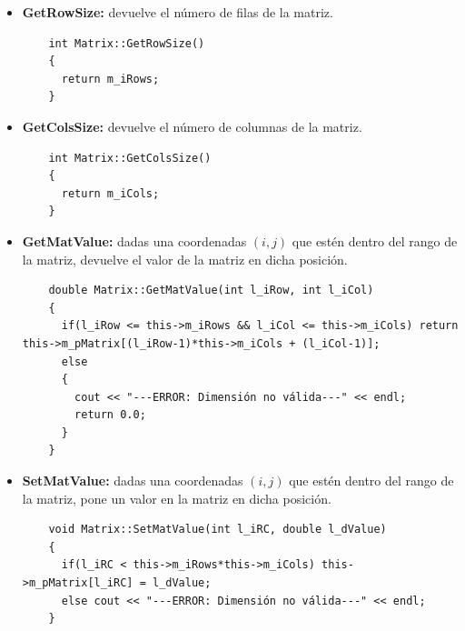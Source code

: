 \begin{itemize}
    \begin{verbatim}
    void Matrix::operator~(void)
    {
      int j =0;
      for(int i = 0; i <this->m_iRows*this->m_iCols; i++)
      {
        cout << m_pMatrix [i] << "\t";
        j++;
        if(j == this->m_iCols)
        {
          cout << endl;
          j=0;
        }
      }
      cout << endl;
    \end{verbatim}
    
    
    \item \textbf{GetRowSize:} devuelve el número de filas de la matriz.
    
    \begin{verbatim}
    int Matrix::GetRowSize()
    {
      return m_iRows;
    }
    \end{verbatim}
    
    
    \item \textbf{GetColsSize:} devuelve el número de columnas de la matriz.
    
    \begin{verbatim}
    int Matrix::GetColsSize()
    {
      return m_iCols;
    }
    \end{verbatim}
    
    
    \item \textbf{GetMatValue:} dadas una coordenadas $(i,j)$ que estén dentro del rango de la matriz, devuelve el valor de la matriz en dicha posición. 
    
    \begin{verbatim}
    double Matrix::GetMatValue(int l_iRow, int l_iCol)
    {
      if(l_iRow <= this->m_iRows && l_iCol <= this->m_iCols) return this->m_pMatrix[(l_iRow-1)*this->m_iCols + (l_iCol-1)];
      else
      {
        cout << "---ERROR: Dimensión no válida---" << endl;
        return 0.0;
      }
    }
    \end{verbatim}
    
    \item \textbf{SetMatValue:} dadas una coordenadas $(i,j)$ que estén dentro del rango de la matriz, pone un valor en la matriz en dicha posición. 
    
    \begin{verbatim}
    void Matrix::SetMatValue(int l_iRC, double l_dValue)
    {
      if(l_iRC < this->m_iRows*this->m_iCols) this->m_pMatrix[l_iRC] = l_dValue;
      else cout << "---ERROR: Dimensión no válida---" << endl;
    }
    \end{verbatim}
\end{itemize}

